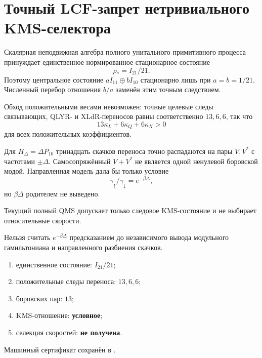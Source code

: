 \chapter{Точный LCF-запрет нетривиального KMS-селектора}
\label{ch:v8-kms-nontracial-relative-rate-lcf-migration-gate}

Скалярная неподвижная алгебра полного унитального примитивного процесса
принуждает единственное нормированное стационарное состояние
\begin{equation}
 \rho_*=I_{21}/21.
\end{equation}
Поэтому центральное состояние $aI_{11}\oplus bI_{10}$ стационарно лишь при
$a=b=1/21$. Численный перебор отношения $b/a$ заменён этим точным следствием.

Обход положительными весами невозможен: точные целевые следы связывающих, QLYR-
и XLdR-переносов равны соответственно $13,6,6$, так что
\begin{equation}
 13\kappa_L+6\kappa_Q+6\kappa_X>0
\end{equation}
для всех положительных коэффициентов.

Для $H_\Delta=\Delta P_{10}$ тринадцать скачков переноса точно распадаются
на пары $V,V^*$ с частотами $\pm\Delta$. Самосопряжённый $V+V^*$ не является
одной ненулевой боровской модой. Направленная модель дала бы только условие
\begin{equation}
 \gamma_\uparrow/\gamma_\downarrow=e^{-\beta\Delta},
\end{equation}
но $\beta\Delta$ родителем не выведено.

\begin{theorem}
Текущий полный QMS допускает только следовое KMS-состояние и не выбирает
относительные скорости.
\end{theorem}
\begin{nogocriterion}
Нельзя считать $e^{-\beta\Delta}$ предсказанием до независимого вывода
модульного гамильтониана и направленного разбиения скачков.
\end{nogocriterion}
\begin{protocol}
\begin{enumerate}
\item единственное состояние: \textbf{$I_{21}/21$};
\item положительные следы переноса: \textbf{$13,6,6$};
\item боровских пар: \textbf{$13$};
\item KMS-отношение: \textbf{условное};
\item селекция скоростей: \textbf{не получена}.
\end{enumerate}
\end{protocol}
Машинный сертификат сохранён в
.